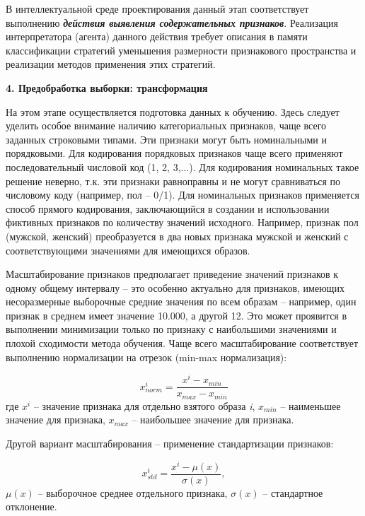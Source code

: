 В интеллектуальной среде проектирования данный этап соответствует выполнению \textbf{\textit{действия выявления содержательных признаков}}. Реализация интерпретатора (агента) данного действия требует описания в памяти классификации стратегий уменьшения размерности признакового пространства и реализации методов применения этих стратегий.


\textbf{4. Предобработка выборки: трансформация}

На этом этапе осуществляется подготовка данных к обучению.
Здесь следует уделить особое внимание наличию категориальных признаков, чаще всего заданных строковыми типами. Эти признаки могут быть номинальными и порядковыми. Для кодирования порядковых признаков чаще всего применяют последовательный числовой код (1, 2, 3,...). Для кодирования номинальных такое решение неверно, т.к. эти признаки равноправны и не могут сравниваться по числовому коду (например, пол -- 0/1). Для номинальных признаков применяется способ прямого кодирования, заключающийся в создании и использовании фиктивных признаков по количеству значений исходного. Например, признак пол (мужской, женский) преобразуется в два новых признака мужской и женский с соответствующими значениями для имеющихся образов.

Масштабирование признаков предполагает приведение значений признаков к одному общему интервалу -- это особенно актуально для признаков, имеющих несоразмерные выборочные средние значения по всем образам -- например, один признак в среднем имеет значение 10.000, а другой 12. Это может проявится в выполнении минимизации только по признаку с наибольшими значениями и плохой сходимости метода обучения. Чаще всего масштабирование соответствует выполнению нормализации на отрезок (min-max нормализация):

\begin{equation*}
	x_{norm}^i = \frac{x^i - x_{min}}{x_{max} - x_{min}}
\end{equation*}
где $x^i$ -- значение признака для отдельно взятого образа \textit{i}, $x_{min}$ -- наименьшее значение для признака, $x_{max}$ -- наибольшее значение для признака.

Другой вариант масштабирования -- применение стандартизации признаков:

\begin{equation*}
	x_{std}^i = \frac{x^i - \mu(x)}{\sigma(x)},
\end{equation*}
$\mu(x)$ -- выборочное среднее отдельного признака, $\sigma(x)$ -- стандартное отклонение.

